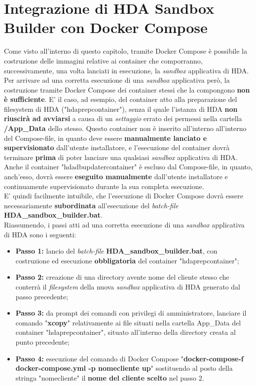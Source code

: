 \section{Integrazione di HDA Sandbox Builder con Docker Compose}
Come visto all'interno di questo capitolo, tramite Docker Compose è possibile la costruzione delle immagini relative ai container che comporranno, successivamente, una volta lanciati in esecuzione, la \textit{sandbox} applicativa di HDA. Per arrivare ad una corretta esecuzione di una \textit{sandbox} applicativa però, la costruzione tramite Docker Compose dei container stessi che la compongono \textbf{non è sufficiente}. E' il caso, ad esempio, del container atto alla preparazione del filesystem di HDA ("hdaprepcontainer"), senza il quale l'istanza di HDA \textbf{non riuscirà ad avviarsi} a causa di un \textit{settaggio} errato dei permessi nella cartella \textbf{/App\_Data} dello stesso. Questo container non è inserito all'interno all'interno del Compose-file, in quanto deve essere \textbf{manualmente lanciato e supervisionato} dall'utente installatore, e l'esecuzione del container dovrà terminare \textbf{prima} di poter lanciare una qualsiasi \textit{sandbox} applicativa di HDA. Anche il container "hdadbupdatercontainer" è escluso dal Compose-file, in quanto, anch'esso, dovrà essere \textbf{eseguito manualmente} dall'utente installatore e continuamente supervisionato durante la sua completa esecuzione.\\
E' quindi facilmente intuibile, che l'esecuzione di Docker Compose dovrà essere necessariamente \textbf{subordinata} all'esecuzione del \textit{batch-file} \textbf{HDA\_sandbox\_builder.bat}.\\
Riassumendo, i passi atti ad una corretta esecuzione di una \textit{sandbox} applicativa di HDA sono i seguenti:
\begin{itemize}
	\item \textbf{Passo 1:} lancio del \textit{batch-file} \textbf{HDA\_sandbox\_builder.bat}, con costruzione ed esecuzione \textbf{obbligatoria} del container "hdaprepcontainer";
	\item \textbf{Passo 2:} creazione di una directory avente nome del cliente stesso che conterrà il \textit{filesystem} della nuova \textit{sandbox} applicativa di HDA generato dal passo precedente;
	\item \textbf{Passo 3:} da prompt dei comandi con privilegi di amministratore, lanciare il comando "\textbf{xcopy}" relativamente ai file situati nella cartella App\_Data del container "hdaprepcontainer", situato all'interno della directory creata al punto precedente;
	\item \textbf{Passo 4:} esecuzione del comando di Docker Compose "\textbf{docker-compose-f docker-compose.yml -p nomecliente up}" sostituendo al posto della stringa "nomecliente" il \textbf{nome del cliente scelto} nel passo 2.
\end{itemize}
